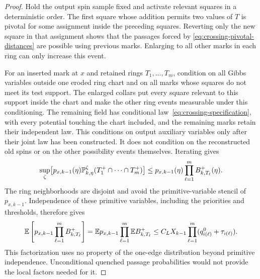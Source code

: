 \begin{proof}
Hold the output spin sample fixed and activate relevant squares in a
deterministic order.  The first square
whose addition permits two values of $T$ is pivotal for some assignment
inside the preceding squares.  Reverting only the new square in that
assignment shows that the passages forced by
\eqref{eq:crossing-pivotal-distances} are possible using previous marks.
Enlarging to all other marks in each ring can only increase this event.

For an inserted mark at $x$ and retained rings $T_1,\ldots,T_m$, condition
on all Gibbs variables outside one eroded ring chart and on all marks
whose squares do not meet its test support.  The enlarged collars put
every square relevant to this support inside the chart and make the
other ring events measurable under this conditioning.  The remaining
field has conditional law~\eqref{eq:crossing-specification}, with every potential
touching the chart included, and the remaining marks retain their
independent law.  This conditions on output auxiliary variables only
after their joint law has been constructed.  It does not condition on
the reconstructed old spins or on the other possibility events themselves.
Iterating gives
\begin{equation}
 \sup_\zeta\bigl[p_{x,k-1}(\eta)
       \mathbb P_{k,\eta}^{\zeta}(T_1^+\cap\cdots\cap T_m^+)\bigr]
 \leq p_{x,k-1}(\eta)\prod_{\ell=1}^m B^+_{k,T_\ell}(\eta).
 \label{eq:crossing-conditional-product}
\end{equation}
The ring neighborhoods are disjoint and avoid the primitive-variable
stencil of $p_{x,k-1}$.  Independence of these primitive variables,
including the priorities and thresholds, therefore gives
\begin{equation}
 \mathbb E\left[p_{x,k-1}\prod_{\ell=1}^m B^+_{k,T_\ell}\right]
 =\mathbb E p_{x,k-1}\prod_{\ell=1}^m\mathbb E B^+_{k,T_\ell}
 \leq C_LX_{k-1}\prod_{\ell=1}^m(q_{i(\ell)}^0+\tau_{i(\ell)}).
 \label{eq:crossing-independent-product}
\end{equation}
This factorization uses no property of the one-edge distribution beyond
primitive independence.  Unconditional quenched passage probabilities
would not provide the local factors needed for it.


\end{proof}
